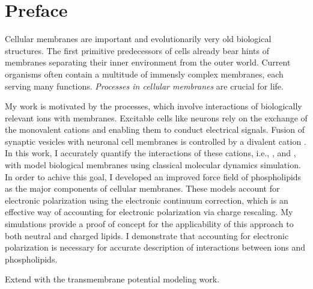 \chapter*{Preface}

Cellular membranes are important and evolutionarily very old biological structures. 
\citep{MolBiolCell, Knudsen_book2002} 
The first primitive predecessors of cells already bear hints of membranes 
separating their inner environment from the outer world. 
Current organisms often contain a multitude of immensly complex membranes, 
each serving many functions. 
\emph{Processes in cellular membranes} are crucial for life. 

My work is motivated by the processes,
which involve interactions of biologically relevant ions with membranes. 
Excitable cells like neurons 
rely on the exchange of the monovalent cations  and 
enabling them to conduct electrical signals. 
Fusion of synaptic vesicles with neuronal cell membranes 
is controlled by a divalent cation .
In this work, 
I accurately quantify the interactions of these cations, 
i.e.,
,  and ,
with model biological membranes
using classical molecular dynamics simulation. 
In order to achive this goal,
I developed an improved force field
of phospholipids as the major components of cellular membranes.
These models account for electronic polarization
using the electronic continuum correction,  
which is an effective way of accounting for electronic polarization via charge rescaling. 
My simulations provide a proof of concept 
for the applicability of this approach 
to both neutral and charged lipids. 
I demonstrate that accounting for electronic polarization 
is necessary for accurate description of interactions 
between ions and phospholipids. 

Extend with the transmembrane potential modeling work.
